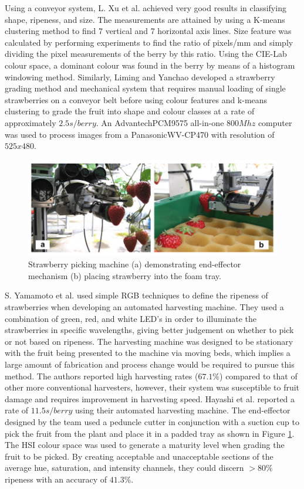 \documentclass[fleqn,twoside,12pt]{report}
\begin{document}
Using a conveyor system, L. Xu et al.\cite{xu} achieved very good results in classifying shape, ripeness, and size. The measurements are attained by using a K-means clustering method to find 7 vertical and 7 horizontal axis lines. Size feature was calculated by performing experiments to find the ratio of pixels/mm and simply dividing the pixel measurements of the berry by this ratio. Using the CIE-Lab colour space, a dominant colour was found in the berry by means of a histogram windowing method. Similarly, Liming and Yanchao \cite{liming} developed a strawberry grading method and mechanical system that requires manual loading of single strawberries on a conveyor belt before using colour features and k-means clustering to grade the fruit into shape and colour classes at a rate of approximately $2.5s/berry$. An Advantech\texttrademark PCM9575 all-in-one $800Mhz$ computer was used to process images from a Panasonic\texttrademark WV-CP470 with resolution of $525x480$. 


\begin{figure}[h]
	\centering
	\includegraphics[width=0.9\linewidth]{strawberry_picker.png}
	\caption{Strawberry picking machine (a) demonstrating end-effector mechanism (b) placing strawberry into the foam tray.}
	\label{fig:strawberry_picker}
\end{figure}%


S. Yamamoto et al.\cite{yamamoto2} used simple RGB techniques to define the ripeness of strawberries when developing an automated harvesting machine. They used a combination of green, red, and white LED's in order to illuminate the strawberries in specific wavelengths, giving better judgement on whether to pick or not based on ripeness. The harvesting machine was designed to be stationary with the fruit being presented to the machine via moving beds, which implies a large amount of fabrication and process change would be required to pursue this method. The authors reported high harvesting rates ($67.1\%$) compared to that of other more conventional harvesters, however, their system was susceptible to fruit damage and requires improvement in harvesting speed. Hayashi et al.\cite{hayashi} reported a rate of $11.5s/berry$ using their automated harvesting machine. The end-effector designed by the team used a peduncle cutter in conjunction with a suction cup to pick the fruit from the plant and place it in a padded tray as shown in Figure \ref{fig:strawberry_picker}. The HSI colour space was used to generate a maturity level when grading the fruit to be picked. By creating acceptable and unacceptable sections of the average hue, saturation, and intensity channels, they could discern $>80\%$ ripeness with an accuracy of $41.3\%$.
\end{document}
